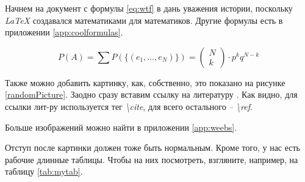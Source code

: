 


\usepackage{amsmath,amsthm,amssymb,breqn}

\usepackage[outputdir=build]{minted}
\makeatletter
{}
\def\dontdofcolorbox{\renewcommand\fcolorbox[4][]{##4}}
\makeatother

\graphicspath{{images/}}





\setcounter{page}{2}

\tableofcontents

\intro

Начнем на документ с формулы \eqref{eq:wtf} в дань уважения истории,
поскольку \emph{LaTeX} создавался математиками для математиков. Другие формулы
есть в приложении \ref{app:coolformulas}.

\begin{equation}\label{eq:wtf}
 P(A) = \sum P(\{ (e_1,\dotsc,e_N) \}) = \begin{pmatrix} N\\k \end{pmatrix} \cdot p^kq^{N-k}
\end{equation}

Также можно добавить картинку, как, собственно, это показано на рисунке
\ref{randomPicture}. Заодно сразу вставим ссылку на литературу \cite{frey2004using}.
Как видно, для ссылки лит-ру используется тег \emph{\textbackslash cite}, для всего
остального -- \emph{\textbackslash ref}.


Больше изображений можно найти в приложении \ref{app:weebs}.

Отступ после картинки должен тоже быть нормальным. Кроме того, у нас есть
рабочие длинные таблицы. Чтобы на них посмотреть, взгляните, например, на
таблицу \ref{tab:mytab}.

